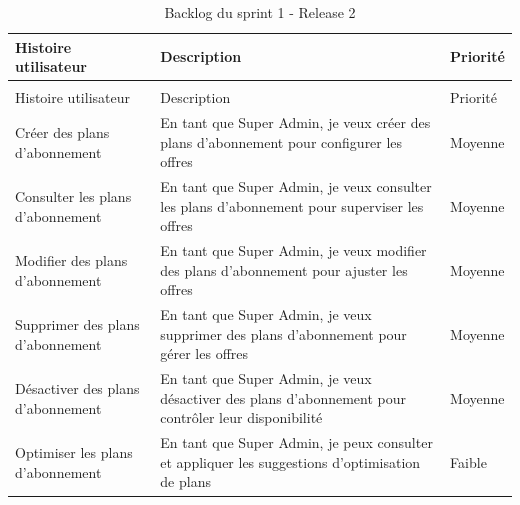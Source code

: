 \begin{longtable}{|>{\raggedright\arraybackslash}p{4cm}|>{\raggedright\arraybackslash}p{7cm}|>{\raggedright\arraybackslash}p{2cm}|}
\caption{Backlog du sprint 1 - Release 2}
\label{tab:sprint1_release2_backlog}\\
\hline
Histoire utilisateur & Description & Priorité \\
\hline
\endfirsthead
\multicolumn{3}{c}{\tablename\ \thetable\ -- suite} \\
\hline
Histoire utilisateur & Description & Priorité \\
\hline
\endhead
Créer des plans d'abonnement & En tant que Super Admin, je veux créer des plans d'abonnement pour configurer les offres & Moyenne \\
\hline
Consulter les plans d'abonnement & En tant que Super Admin, je veux consulter les plans d'abonnement pour superviser les offres & Moyenne \\
\hline
Modifier des plans d'abonnement & En tant que Super Admin, je veux modifier des plans d'abonnement pour ajuster les offres & Moyenne \\
\hline
Supprimer des plans d'abonnement & En tant que Super Admin, je veux supprimer des plans d'abonnement pour gérer les offres & Moyenne \\
\hline
Désactiver des plans d'abonnement & En tant que Super Admin, je veux désactiver des plans d'abonnement pour contrôler leur disponibilité & Moyenne \\
\hline
Optimiser les plans d'abonnement & En tant que Super Admin, je peux consulter et appliquer les suggestions d'optimisation de plans & Faible \\
\hline
 

\end{longtable}
